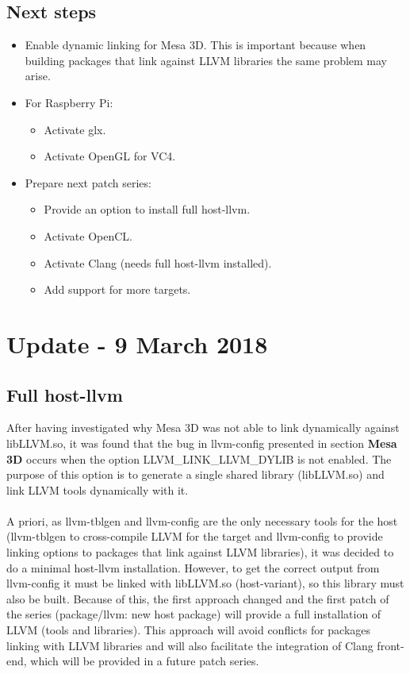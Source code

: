 \documentclass[12pt,a4paper,oneside]{article}
\begin{document}
\subsection*{Next steps}
\begin{itemize}
  \item Enable dynamic linking for Mesa 3D. This is important because when building
        packages that link against LLVM libraries the same problem may arise.
  \item For Raspberry Pi:
    \begin{itemize}
      \item Activate glx.
      \item Activate OpenGL for VC4.
    \end{itemize}
  \item Prepare next patch series:
  \begin{itemize}
    \item Provide an option to install full host-llvm.
    \item Activate OpenCL.
    \item Activate Clang (needs full host-llvm installed).
    \item Add support for more targets.
  \end{itemize}
\end{itemize}

\newpage
\section*{Update - 9 March 2018}

\subsection*{Full host-llvm}
After having investigated why Mesa 3D was not able to link dynamically against
libLLVM.so, it was found that the bug in llvm-config presented in section \textbf{Mesa 3D}
occurs when the option LLVM\_LINK\_LLVM\_DYLIB is not enabled. The purpose of this
option is to generate a single shared library (libLLVM.so) and link LLVM tools
dynamically with it.\\\\
A priori, as llvm-tblgen and llvm-config are the only necessary tools for the host
(llvm-tblgen to cross-compile LLVM for the target and llvm-config to provide linking
options to packages that link against LLVM libraries), it was decided to do a
minimal host-llvm installation. However, to get the correct output from llvm-config
it must be linked with libLLVM.so (host-variant), so this library must also be built.
Because of this, the first approach changed and the first patch of the series
(package/llvm: new host package) will provide a full installation of LLVM (tools
and libraries). This approach will avoid conflicts for packages linking with
LLVM libraries and will also facilitate the integration of Clang front-end, which
will be provided in a future patch series.
\end{document}
